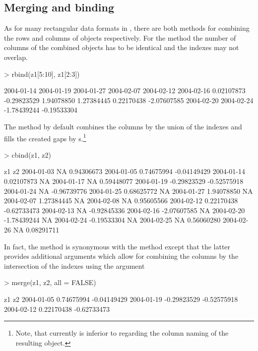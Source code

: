 \documentclass{Z}
\begin{document}
\subsection{Merging and binding}
\label{sec:merge}

As for many rectangular data formats in , there are
both methods for combining the rows and columns of 
objects respectively. For the  method the number of
columns of the combined objects has to be identical and the
indexes may not overlap.
\begin{Schunk}
\begin{Sinput}
> rbind(z1[5:10], z1[2:3])
\end{Sinput}
\begin{Soutput}
 2004-01-14  2004-01-19  2004-01-27  2004-02-07  2004-02-12  2004-02-16 
 0.02107873 -0.29823529  1.94078850  1.27384445  0.22170438 -2.07607585 
 2004-02-20  2004-02-24 
-1.78439244 -0.19533304 
\end{Soutput}
\end{Schunk}
The  method by default combines the columns by the union of
the indexes and fills the created gaps by s.\footnote{Note,
that  currently is inferior to  regarding the
column naming of the resulting object.}
\begin{Schunk}
\begin{Sinput}
> cbind(z1, z2)
\end{Sinput}
\begin{Soutput}
           z1          z2         
2004-01-03          NA  0.94306673
2004-01-05  0.74675994 -0.04149429
2004-01-14  0.02107873          NA
2004-01-17          NA  0.59448077
2004-01-19 -0.29823529 -0.52575918
2004-01-24          NA -0.96739776
2004-01-25  0.68625772          NA
2004-01-27  1.94078850          NA
2004-02-07  1.27384445          NA
2004-02-08          NA  0.95605566
2004-02-12  0.22170438 -0.62733473
2004-02-13          NA -0.92845336
2004-02-16 -2.07607585          NA
2004-02-20 -1.78439244          NA
2004-02-24 -0.19533304          NA
2004-02-25          NA  0.56060280
2004-02-26          NA  0.08291711
\end{Soutput}
\end{Schunk}
In fact, the  method is synonymous with the 
method except that the latter provides additional arguments
which allow for combining the columns by the intersection
of the indexes using the argument 
\begin{Schunk}
\begin{Sinput}
> merge(z1, z2, all = FALSE)
\end{Sinput}
\begin{Soutput}
           z1          z2         
2004-01-05  0.74675994 -0.04149429
2004-01-19 -0.29823529 -0.52575918
2004-02-12  0.22170438 -0.62733473
\end{Soutput}
\end{Schunk}
\end{document}
